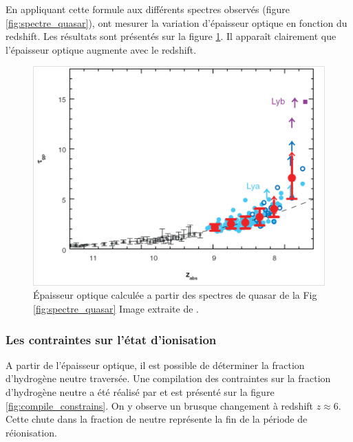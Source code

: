 En appliquant cette formule aux différents spectres observés (figure \ref{fig:spectre_quasar}), \cite{fan_constraining_2006} ont mesurer la variation d'épaisseur optique en fonction du redshift.
Les résultats sont présentés sur la figure \ref{fig:epaisseur_optique_quasar}.
Il apparaît clairement que l'épaisseur optique augmente avec le redshift.

\begin{figure}
        \includegraphics[width=.95\linewidth]{img/01/epaisseur_optique_quasar.png} 
        \caption[Epaisseur optique Lyman alpha]{%
		Épaisseur optique calculée a partir des spectres de quasar de la Fig\,\ref{fig:spectre_quasar}
        Image extraite de \cite{fan_constraining_2006}.}
 		\label{fig:epaisseur_optique_quasar}
\end{figure}

\subsubsection{Les contraintes sur l'état d'ionisation}

A partir de l'épaisseur optique, il est possible de déterminer la fraction d'hydrogène neutre traversée.
Une compilation des contraintes sur la fraction d'hydrogène neutre a été réalisé par \cite{2015ApJ...811..140B} et est présenté sur la figure \ref{fig:compile_constrains}.
On y observe un brusque changement à redshift $z\approx6$.
Cette chute dans la fraction de neutre représente la fin de la période de réionisation.

